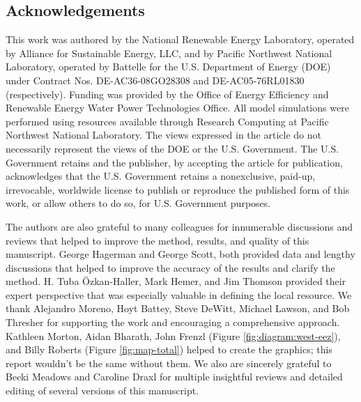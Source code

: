 \documentclass[authoryear,preprint,review,12pt]{elsarticle}
\begin{document}
\begin{linenumbers}






\section*{Acknowledgements}
This work was authored by the National Renewable Energy Laboratory, operated by Alliance for Sustainable Energy, LLC, and by Pacific Northwest National Laboratory, operated by Battelle for the U.S. Department of Energy (DOE) under Contract Nos. DE-AC36-08GO28308 and DE-AC05-76RL01830 (respectively). Funding was provided by the Office of Energy Efficiency and Renewable Energy Water Power Technologies Office. All model simulations were performed using resources available through Research Computing at Pacific Northwest National Laboratory. The views expressed in the article do not necessarily represent the views of the DOE or the U.S. Government. The U.S. Government retains and the publisher, by accepting the article for publication, acknowledges that the U.S. Government retains a nonexclusive, paid-up, irrevocable, worldwide license to publish or reproduce the published form of this work, or allow others to do so, for U.S. Government purposes. 

The authors are also grateful to many colleagues for innumerable discussions and reviews that helped to improve the method, results, and quality of this manuscript. George Hagerman and George Scott, both provided data and lengthy discussions that helped to improve the accuracy of the results and clarify the method. H. Tuba \"{O}zkan-Haller, Mark Hemer, and Jim Thomson provided their expert perspective that was especially valuable in defining the local resource. We thank Alejandro Moreno, Hoyt Battey, Steve DeWitt, Michael Lawson, and Bob Thresher for supporting the work and encouraging a comprehensive approach. Kathleen Morton, Aidan Bharath, John Frenzl (Figure \ref{fig:diagram:west-eez}), and Billy Roberts (Figure \ref{fig:map-total}) helped to create the graphics; this report wouldn't be the same without them. We also are sincerely grateful to Becki Meadows and Caroline Draxl for multiple insightful reviews and detailed editing of several versions of this manuscript.

\appendix
\setcounter{figure}{0}

\setcounter{figure}{0}

\setcounter{figure}{0}

\end{linenumbers}



\end{document}
